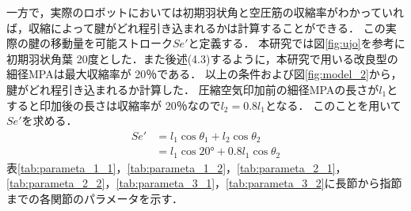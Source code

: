 一方で，実際のロボットにおいては初期羽状角と空圧筋の収縮率がわかっていれば，収縮によって腱がどれ程引き込まれるかは計算することができる．
この実際の腱の移動量を可能ストローク$Se'$と定義する．
本研究では図\ref{fig:ujo}を参考に初期羽状角葉 20度とした．また後述(4.3)するように，本研究で用いる改良型の細径MPAは最大収縮率が 20％である．
以上の条件および図\ref{fig:model_2}から，腱がどれ程引き込まれるか計算した．
圧縮空気印加前の細径MPAの長さが$l_1$とすると印加後の長さは収縮率が 20％なので$l_2 = 0.8l_1$となる．
このことを用いて$ Se'$を求める．
\begin{equation}
  \begin {split}
  Se'  & = l_1\cos\theta_1 + l_2\cos\theta_2\\
       & = l_1\cos20° + 0.8l_1\cos\theta_2
  \end{split}
\end{equation}
表\ref{tab:parameta_1_1}，\ref{tab:parameta_1_2}，\ref{tab:parameta_2_1}，\ref{tab:parameta_2_2}，\ref{tab:parameta_3_1}，\ref{tab:parameta_3_2}に長節から指節までの各関節のパラメータを示す．
